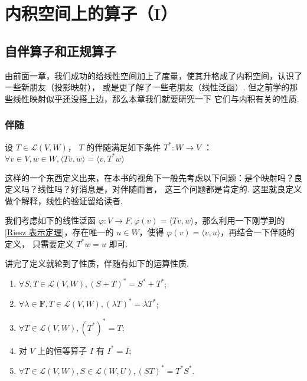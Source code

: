 \chapter{内积空间上的算子（I）}

\section{自伴算子和正规算子}

由前面一章，我们成功的给线性空间加上了度量，使其升格成了内积空间，认识了一些新朋友（投影映射），
或是更了解了一些老朋友（线性泛函）. 但之前学的那些线性映射似乎还没搭上边，那么本章我们就要研究一下
它们与内积有关的性质. 

\subsection{伴随}

\begin{definition}
     设 $ T \in \mathcal{L}(V, W) $， $ T $ 的伴随满足如下条件 $ T^*: W \rightarrow V $
    ： $ \forall v \in V, w \in W, \langle Tv, w \rangle = \langle v, T^*w \rangle$ 
\end{definition}

这样的一个东西定义出来，在本书的视角下一般先考虑以下问题：是个映射吗？良定义吗？线性吗？好消息是，对伴随而言，
这三个问题都是肯定的. 这里就良定义做个解释，线性的验证留给读者. 

我们考虑如下的线性泛函 $ \varphi : V \rightarrow F, \varphi (v) = \langle Tv, w \rangle $，那么利用一下刚学到的
\ref{Riesz 表示定理}，存在唯一的 $ u \in W $，使得 $ \varphi (v) = \langle v, u \rangle $，再结合一下伴随的定义，
只需要定义 $ T^*w = u $ 即可. %

讲完了定义就轮到了性质，伴随有如下的运算性质. 
\begin{enumerate}
    \item $ \forall S, T \in \mathcal{L}(V, W), (S + T)^* = S^* + T^* $;

    \item $  \forall \lambda \in \mathbf{F}, T \in \mathcal{L}(V, W), (\lambda T)^* = \overline{\lambda} T^* $;

    \item $ \forall T \in \mathcal{L}(V, W), (T^*)^* = T $;
    
    \item 对 $ V $ 上的恒等算子 $ I $ 有 $ I^* = I $;
    
    \item $ \forall T \in \mathcal{L}(V, W), S \in \mathcal{L}(W, U), (ST)^* = T^*S^* $. 
\end{enumerate}

